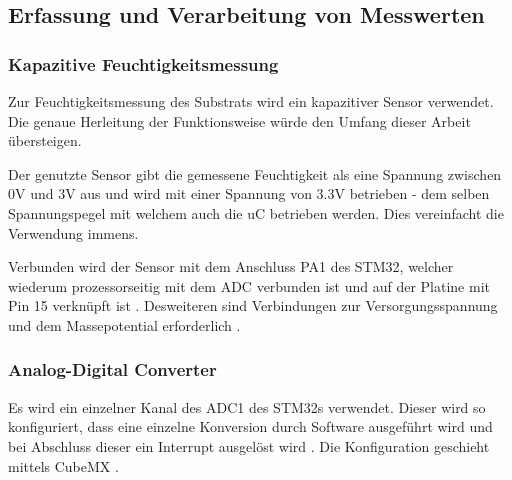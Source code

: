 \subsection{Erfassung und Verarbeitung von Messwerten}
\subsubsection{Kapazitive Feuchtigkeitsmessung}

Zur Feuchtigkeitsmessung des Substrats wird ein kapazitiver Sensor verwendet. Die genaue Herleitung der Funktionsweise würde den Umfang dieser Arbeit übersteigen.

\smallskip

Der genutzte Sensor \citep{Sensor} gibt die gemessene Feuchtigkeit als eine Spannung zwischen 0V und 3V aus und wird mit einer Spannung von 3.3V betrieben - dem 
selben Spannungspegel mit welchem auch die \ac{uC} betrieben werden. Dies vereinfacht die Verwendung immens.

\smallskip

Verbunden wird der Sensor mit dem Anschluss PA1 des STM32, welcher wiederum prozessorseitig mit dem \ac{ADC} verbunden ist \citep{STM32_Datasheet} und auf der Platine mit 
Pin 15 verknüpft ist \citep{IoTGateway}. Desweiteren sind Verbindungen zur Versorgungsspannung und dem Massepotential erforderlich \citep{Sensor}.



\subsubsection{Analog-Digital Converter}

Es wird ein einzelner Kanal des ADC1 des STM32s verwendet. Dieser wird so konfiguriert, dass eine einzelne Konversion durch Software ausgeführt wird und bei Abschluss
dieser ein Interrupt ausgelöst wird \citep{STM32_Ref}. Die Konfiguration geschieht mittels CubeMX \citep{CubeMX}.

